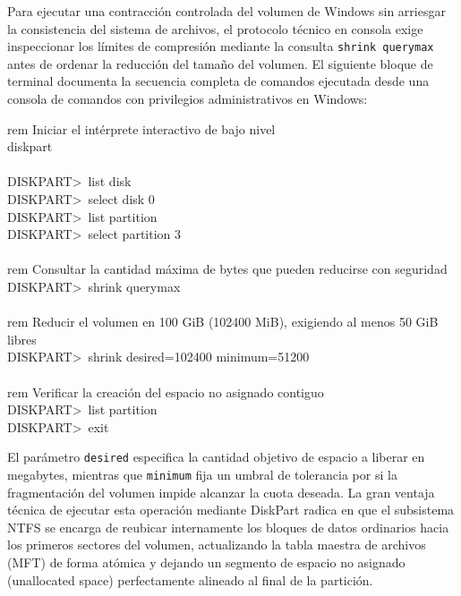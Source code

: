 \documentclass[12pt]{article}
\begin{document}
Para ejecutar una contracción controlada del volumen de Windows sin arriesgar la consistencia del sistema de archivos, el protocolo técnico en consola exige inspeccionar los límites de compresión mediante la consulta \texttt{shrink querymax} antes de ordenar la reducción del tamaño del volumen. El siguiente bloque de terminal documenta la secuencia completa de comandos ejecutada desde una consola de comandos con privilegios administrativos en Windows:

\begin{mdframed}[style=terminal]
\ttfamily\upshape\color{bashLetterColor}\footnotesize
rem Iniciar el intérprete interactivo de bajo nivel \\
diskpart \\
\\
DISKPART\textgreater\ list disk \\
DISKPART\textgreater\ select disk 0 \\
DISKPART\textgreater\ list partition \\
DISKPART\textgreater\ select partition 3 \\
\\
rem Consultar la cantidad máxima de bytes que pueden reducirse con seguridad \\
DISKPART\textgreater\ shrink querymax \\
\\
rem Reducir el volumen en 100 GiB (102400 MiB), exigiendo al menos 50 GiB libres \\
DISKPART\textgreater\ shrink desired=102400 minimum=51200 \\
\\
rem Verificar la creación del espacio no asignado contiguo \\
DISKPART\textgreater\ list partition \\
DISKPART\textgreater\ exit
\end{mdframed}

El parámetro \texttt{desired} especifica la cantidad objetivo de espacio a liberar en megabytes, mientras que \texttt{minimum} fija un umbral de tolerancia por si la fragmentación del volumen impide alcanzar la cuota deseada. La gran ventaja técnica de ejecutar esta operación mediante DiskPart radica en que el subsistema NTFS se encarga de reubicar internamente los bloques de datos ordinarios hacia los primeros sectores del volumen, actualizando la tabla maestra de archivos (MFT) de forma atómica y dejando un segmento de espacio no asignado (unallocated space) perfectamente alineado al final de la partición.
\end{document}

